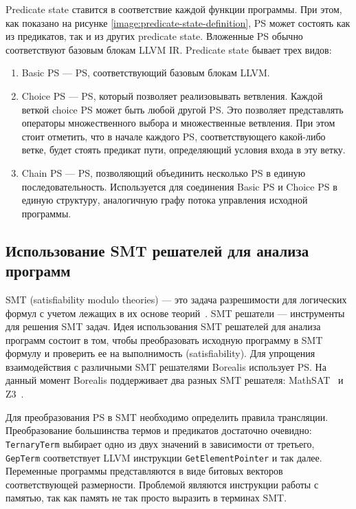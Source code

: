 Predicate state ставится в соответствие каждой функции программы. При этом, как показано на рисунке \ref{image:predicate-state-definition}, PS может состоять как из предикатов, так и из других predicate state. Вложенные PS обычно соответствуют базовым блокам LLVM IR. Predicate state бывает трех видов:
\begin{enumerate}
\item Basic PS --- PS, соответствующий базовым блокам LLVM.
\item Choice PS --- PS, который позволяет реализовывать ветвления. Каждой веткой choice PS может быть любой другой PS. Это позволяет представлять операторы множественного выбора и множественные ветвления. При этом стоит отметить, что в начале каждого PS, соответствующего какой-либо ветке, будет стоять предикат пути, определяющий условия входа в эту ветку.
\item Chain PS --- PS, позволяющий объединить несколько PS в единую последовательность. Используется для соединения Basic PS и Choice PS в единую структуру, аналогичную графу потока управления исходной программы.
\end{enumerate}

\subsection{Использование SMT решателей для анализа программ}
SMT (satisfiability modulo theories) --- это задача разрешимости для логических формул с учетом лежащих в их основе теорий~\cite{smt}. SMT решатели --- инструменты для решения SMT задач. Идея использования SMT решателей для анализа программ состоит в том, чтобы преобразовать исходную программу в SMT формулу и проверить ее на выполнимость (satisfiability). Для упрощения взаимодействия с различными SMT решателями Borealis использует PS. На данный момент Borealis поддерживает два разных SMT решателя: MathSAT~\cite{mathsatsolver} и Z3~\cite{z3solver}. 

Для преобразования PS в SMT необходимо определить правила трансляции. Преобразование большинства термов и предикатов достаточно очевидно: \texttt{TernaryTerm} выбирает одно из двух значений в зависимости от третьего, \texttt{GepTerm} соответствует LLVM инструкции \texttt{GetElementPointer} и так далее. Переменные программы представляются в виде битовых векторов соответствующей размерности. Проблемой являются инструкции работы с памятью, так как память не так просто выразить в терминах SMT.

